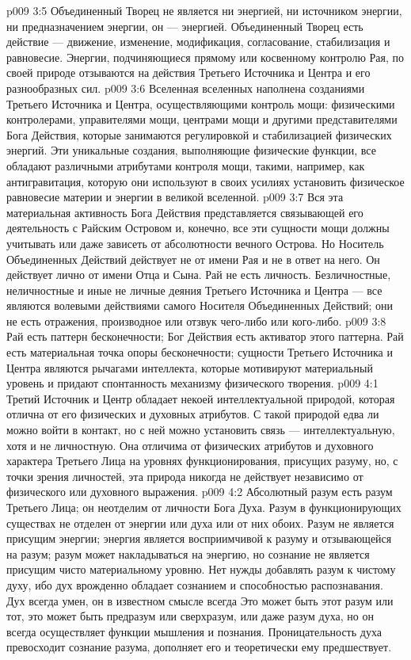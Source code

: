 \vs p009 3:5 \pc Объединенный Творец не является ни энергией, ни источником энергии, ни предназначением энергии, он ---  энергией. Объединенный Творец есть действие --- движение, изменение, модификация, согласование, стабилизация и равновесие. Энергии, подчиняющиеся прямому или косвенному контролю Рая, по своей природе отзываются на действия Третьего Источника и Центра и его разнообразных сил.
\vs p009 3:6 Вселенная вселенных наполнена созданиями Третьего Источника и Центра, осуществляющими контроль мощи: физическими контролерами, управителями мощи, центрами мощи и другими представителями Бога Действия, которые занимаются регулировкой и стабилизацией физических энергий. Эти уникальные создания, выполняющие физические функции, все обладают различными атрибутами контроля мощи, такими, например, как антигравитация, которую они используют в своих усилиях установить физическое равновесие материи и энергии в великой вселенной.
\vs p009 3:7 Вся эта материальная активность Бога Действия представляется связывающей его деятельность с Райским Островом и, конечно, все эти сущности мощи должны учитывать или даже зависеть от абсолютности вечного Острова. Но Носитель Объединенных Действий действует не от имени Рая и не в ответ на него. Он действует лично от имени Отца и Сына. Рай не есть личность. Безличностные, неличностные и иные не личные деяния Третьего Источника и Центра --- все являются волевыми действиями самого Носителя Объединенных Действий; они не есть отражения, производное или отзвук чего\hyp{}либо или кого\hyp{}либо.
\vs p009 3:8 Рай есть паттерн бесконечности; Бог Действия есть активатор этого паттерна. Рай есть материальная точка опоры бесконечности; сущности Третьего Источника и Центра являются рычагами интеллекта, которые мотивируют материальный уровень и придают спонтанность механизму физического творения.
\vs p009 4:1 Третий Источник и Центр обладает некоей интеллектуальной природой, которая отлична от его физических и духовных атрибутов. С такой природой едва ли можно войти в контакт, но с ней можно установить связь --- интеллектуальную, хотя и не личностную. Она отличима от физических атрибутов и духовного характера Третьего Лица на уровнях функционирования, присущих разуму, но, с точки зрения личностей, эта природа никогда не действует независимо от физического или духовного выражения.
\vs p009 4:2 Абсолютный разум есть разум Третьего Лица; он неотделим от личности Бога Духа. Разум в функционирующих существах не отделен от энергии или духа или от них обоих. Разум не является присущим энергии; энергия является восприимчивой к разуму и отзывающейся на разум; разум может накладываться на энергию, но сознание не является присущим чисто материальному уровню. Нет нужды добавлять разум к чистому духу, ибо дух врожденно обладает сознанием и способностью распознавания. Дух всегда умен, он в известном смысле всегда  Это может быть этот разум или тот, это может быть предразум или сверхразум, или даже разум духа, но он всегда осуществляет функции мышления и познания. Проницательность духа превосходит сознание разума, дополняет его и теоретически ему предшествует.
